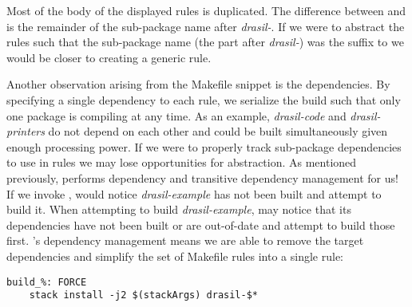 Most of the body of the displayed rules is duplicated. The difference between  and  is the remainder of the sub-package name after \textit{drasil-}. If we were to abstract the rules such that the sub-package name (the part after \textit{drasil-}) was the suffix to  we would be closer to creating a generic rule.%

%
%
%
%

Another observation arising from the Makefile snippet is the dependencies. By specifying a single dependency to each  rule, we serialize the build such that only one package is compiling at any time. As an example, \textit{drasil-code} and \textit{drasil-printers} do not depend on each other and could be built simultaneously given enough processing power. If we were to properly track sub-package dependencies to use in rules we may lose opportunities for abstraction. As mentioned previously,  performs dependency and transitive dependency management for us! If we invoke ,  would notice \textit{drasil-example} has not been built and attempt to build it. When attempting to build \textit{drasil-example},  may notice that its dependencies have not been built or are out-of-date and attempt to build those first. 's dependency management means we are able to remove the target dependencies and simplify the set of Makefile rules into a single rule:

\begin{tcolorbox}
\begin{verbatim}
build_%: FORCE
	stack install -j2 $(stackArgs) drasil-$*
\end{verbatim}
\end{tcolorbox}

